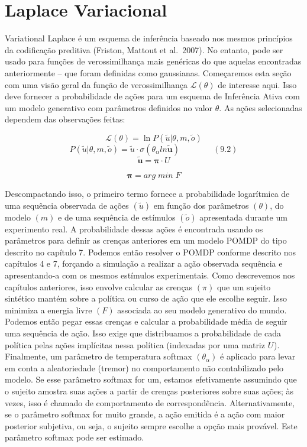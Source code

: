 \documentclass[
  12pt,
]{book}
\begin{document}
\hypertarget{laplace-variacional}{%
\section{Laplace Variacional}\label{laplace-variacional}}

Variational Laplace é um esquema de inferência baseado nos mesmos princípios da codificação preditiva (Friston, Mattout et al.~2007). No entanto, pode ser usado para funções de verossimilhança mais genéricas do que aquelas encontradas anteriormente -- que foram definidas como gaussianas. Começaremos esta seção com uma visão geral da função de verossimilhança \(\mathcal L(\theta)\) de interesse aqui. Isso deve fornecer a probabilidade de ações para um esquema de Inferência Ativa com um modelo generativo com parâmetros definidos no valor \(\theta\). As ações selecionadas dependem das observações feitas:

\[ \mathcal L(\theta)=\ln P(\tilde u |\theta,m,\tilde o )\]
\[ P(\tilde u |\theta,m,\tilde o ) = \tilde u \cdot \sigma (\theta_\alpha ln  \pmb {\tilde u}) \qquad\qquad (9.2)\]
\[ \pmb {\tilde u} = \pmb \pi \cdot U\]

\[ \pmb \pi =arg \;min\; F \]

Descompactando isso, o primeiro termo fornece a probabilidade logarítmica de uma sequência observada de ações \((\tilde u)\) em função dos parâmetros \((\theta)\), do modelo \((m)\) e de uma sequência de estímulos \((\tilde o)\) apresentada durante um experimento real. A probabilidade dessas ações é encontrada usando os parâmetros para definir as crenças anteriores em um modelo POMDP do tipo descrito no capítulo 7. Podemos então resolver o POMDP conforme descrito nos capítulos 4 e 7, forçando a simulação a realizar a ação observada sequência e apresentando-a com os mesmos estímulos experimentais. Como descrevemos nos capítulos anteriores, isso envolve calcular as crenças \((\pi)\) que um sujeito sintético mantém sobre a política ou curso de ação que ele escolhe seguir. Isso minimiza a energia livre \((F)\) associada ao seu modelo generativo do mundo. Podemos então pegar essas crenças e calcular a probabilidade média de seguir uma sequência de ação. Isso exige que distribuamos a probabilidade de cada política pelas ações implícitas nessa política (indexadas por uma matriz \(U\) ). Finalmente, um parâmetro de temperatura softmax \((θ_\alpha)\) é aplicado para levar em conta a aleatoriedade (tremor) no comportamento não contabilizado pelo modelo. Se esse parâmetro softmax for um, estamos efetivamente assumindo que o sujeito amostra suas ações a partir de crenças posteriores sobre suas ações; às vezes, isso é chamado de comportamento de correspondência. Alternativamente, se o parâmetro softmax for muito grande, a ação emitida é a ação com maior posterior subjetiva, ou seja, o sujeito sempre escolhe a opção mais provável. Este parâmetro softmax pode ser estimado.
\end{document}
